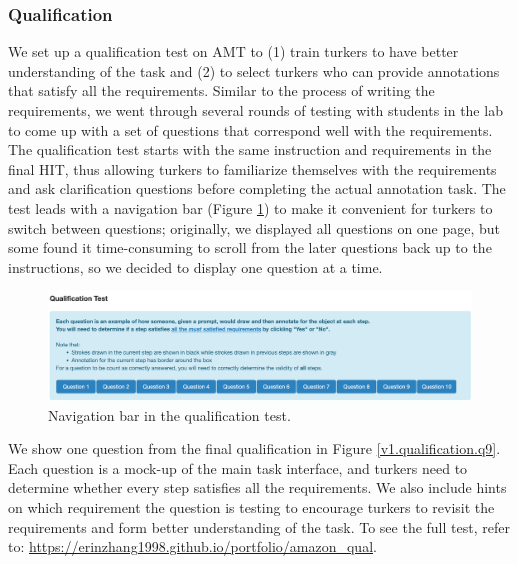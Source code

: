 
\subsubsection{Qualification}



We set up a qualification test on AMT to (1) train turkers to have better understanding of the task and (2) to select turkers who can provide annotations that satisfy all the requirements. 
Similar to the process of writing the requirements, we went through several rounds of testing with students in the lab to come up with a set of questions that correspond well with the requirements. 
The qualification test starts with the same instruction and requirements in the final HIT, thus allowing turkers to familiarize themselves with the requirements and ask clarification questions before completing the actual annotation task. 
The test leads with a navigation bar (Figure \ref{v1.qualification.nav}) to make it convenient for turkers to switch between questions; originally, we displayed all questions on one page, but some found it time-consuming to scroll from the later questions back up to the instructions, so we decided to display one question at a time. 
\begin{figure}[]
\includegraphics[width=\linewidth]{data_collection/v1_qual_header.png}  
\caption{Navigation bar in the qualification test.}
\label{v1.qualification.nav}
\end{figure}

We show one question from the final qualification in Figure \ref{v1.qualification.q9}. 
Each question is a mock-up of the main task interface, and turkers need to determine whether every step satisfies all the requirements.
We also include hints on which requirement the question is testing to encourage turkers to revisit the requirements and form better understanding of the task.  
To see the full test, refer to: \url{https://erinzhang1998.github.io/portfolio/amazon_qual}.

